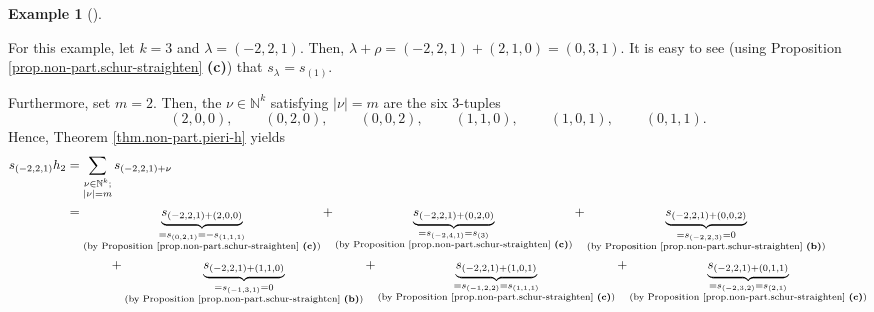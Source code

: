 \documentclass[numbers=enddot,12pt,final,onecolumn,notitlepage]{scrartcl}%
\theoremstyle{definition}
\newtheorem{exmp}[theo]{Example}
\newenvironment{example}[1][]
{\begin{exmp}[#1]\begin{leftbar}}
{\end{leftbar}\end{exmp}}
\let\sumnonlimits\sum
\renewcommand{\sum}{\sumnonlimits\limits}
\begin{document}
\begin{example}
For this example, let $k=3$ and $\lambda=\left(  -2,2,1\right)  $. Then,
$\lambda+\rho=\left(  -2,2,1\right)  +\left(  2,1,0\right)  =\left(
0,3,1\right)  $. It is easy to see (using Proposition
\ref{prop.non-part.schur-straighten} \textbf{(c)}) that $s_{\lambda
}=s_{\left(  1\right)  }$.

Furthermore, set $m=2$. Then, the $\nu\in\mathbb{N}^{k}$ satisfying
$\left\vert \nu\right\vert =m$ are the six $3$-tuples%
\[
\left(  2,0,0\right)  ,\ \ \ \ \ \ \ \ \ \ \left(  0,2,0\right)
,\ \ \ \ \ \ \ \ \ \ \left(  0,0,2\right)  ,\ \ \ \ \ \ \ \ \ \ \left(
1,1,0\right)  ,\ \ \ \ \ \ \ \ \ \ \left(  1,0,1\right)
,\ \ \ \ \ \ \ \ \ \ \left(  0,1,1\right)  .
\]
Hence, Theorem \ref{thm.non-part.pieri-h} yields%
\begin{align*}
s_{\left(  -2,2,1\right)  }h_{2}  &  =\sum_{\substack{\nu\in\mathbb{N}%
^{k};\\\left\vert \nu\right\vert =m}}s_{\left(  -2,2,1\right)  +\nu}\\
&  =\underbrace{s_{\left(  -2,2,1\right)  +\left(  2,0,0\right)  }%
}_{\substack{=s_{\left(  0,2,1\right)  }=-s_{\left(  1,1,1\right)
}\\\text{(by Proposition \ref{prop.non-part.schur-straighten} \textbf{(c)})}%
}}+\underbrace{s_{\left(  -2,2,1\right)  +\left(  0,2,0\right)  }%
}_{\substack{=s_{\left(  -2,4,1\right)  }=s_{\left(  3\right)  }\\\text{(by
Proposition \ref{prop.non-part.schur-straighten} \textbf{(c)})}}%
}+\underbrace{s_{\left(  -2,2,1\right)  +\left(  0,0,2\right)  }%
}_{\substack{=s_{\left(  -2,2,3\right)  }=0\\\text{(by Proposition
\ref{prop.non-part.schur-straighten} \textbf{(b)})}}}\\
&  \ \ \ \ \ \ \ \ \ \ +\underbrace{s_{\left(  -2,2,1\right)  +\left(
1,1,0\right)  }}_{\substack{=s_{\left(  -1,3,1\right)  }=0\\\text{(by
Proposition \ref{prop.non-part.schur-straighten} \textbf{(b)})}}%
}+\underbrace{s_{\left(  -2,2,1\right)  +\left(  1,0,1\right)  }%
}_{\substack{=s_{\left(  -1,2,2\right)  }=s_{\left(  1,1,1\right)
}\\\text{(by Proposition \ref{prop.non-part.schur-straighten} \textbf{(c)})}%
}}+\underbrace{s_{\left(  -2,2,1\right)  +\left(  0,1,1\right)  }%
}_{\substack{=s_{\left(  -2,3,2\right)  }=s_{\left(  2,1\right)  }\\\text{(by
Proposition \ref{prop.non-part.schur-straighten} \textbf{(c)})}}}\\

\end{align*}
\end{example}
\end{document}
